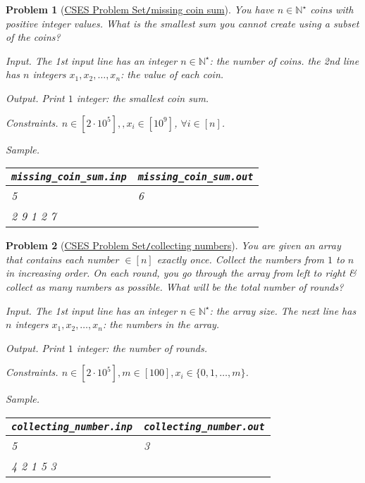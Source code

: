 \documentclass{article}
\newtheorem{problem}{Problem}
\begin{document}
\begin{problem}[\href{https://cses.fi/problemset/task/2183}{CSES Problem Set{\tt/}missing coin sum}]
    You have $n\in\mathbb{N}^\star$ coins with positive integer values. What is the smallest sum you cannot create using a subset of the coins?
    \item {\sf Input.} The 1st input line has an integer $n\in\mathbb{N}^\star$: the number of coins. the 2nd line has $n$ integers $x_1,x_2,\ldots,x_n$: the value of each coin.
    \item {\sf Output.} Print $1$ integer: the smallest coin sum.
    \item {\sf Constraints.} $n\in[2\cdot10^5],,x_i\in[10^9]$, $\forall i\in[n]$.
    \item {\sf Sample.}
    \begin{table}[H]
        \centering
        \begin{tabular}{|l|l|}
            \hline
            \verb|missing_coin_sum.inp| & \verb|missing_coin_sum.out| \\
            \hline
            5 & 6 \\
            2 9 1 2 7 & \\
            \hline
        \end{tabular}
    \end{table}
\end{problem}

\begin{problem}[\href{https://cses.fi/problemset/task/2216}{CSES Problem Set{\tt/}collecting numbers}]
    You are given an array that contains each number $\in[n]$ exactly once. Collect the numbers from $1$ to $n$ in increasing order. On each round, you go through the array from left to right \& collect as many numbers as possible. What will be the total number of rounds?
    \item {\sf Input.} The 1st input line has an integer $n\in\mathbb{N}^\star$: the array size. The next line has $n$ integers $x_1,x_2,\ldots,x_n$: the numbers in the array.
    \item {\sf Output.} Print $1$ integer: the number of rounds.
    \item {\sf Constraints.} $n\in[2\cdot10^5],m\in[100],x_i\in\{0,1,\ldots,m\}$.
    \item {\sf Sample.}
    \begin{table}[H]
        \centering
        \begin{tabular}{|l|l|}
            \hline
            \verb|collecting_number.inp| & \verb|collecting_number.out| \\
            \hline
            5 & 3 \\
            4 2 1 5 3 & \\
            \hline
        \end{tabular}
    \end{table}
\end{problem}
\end{document}
